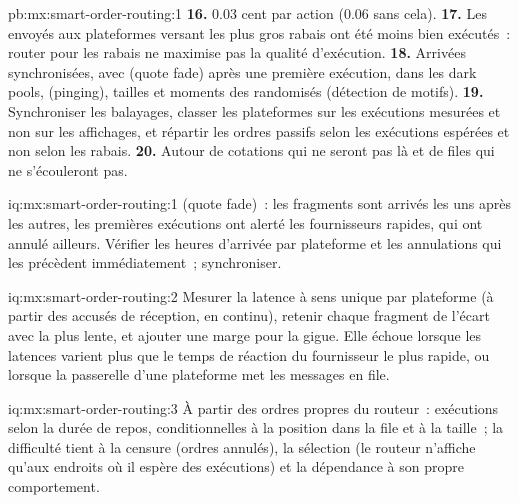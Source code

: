 \begin{solution}{pb:mx:smart-order-routing:1}
\textbf{16.} 0.03 cent par action (0.06 sans cela).
\textbf{17.} Les  envoyés aux plateformes versant les plus gros rabais ont été moins bien exécutés~: router pour les rabais ne maximise pas la qualité d'exécution.
\textbf{18.} Arrivées synchronisées, avec  (quote fade) après une première exécution,  dans les dark pools,  (pinging),
tailles et moments des  randomisés (détection de motifs).
\textbf{19.} Synchroniser les balayages, classer les plateformes sur les exécutions mesurées et non sur les affichages, et répartir les ordres passifs selon les exécutions espérées et non selon les rabais.
\textbf{20.} Autour de cotations qui ne seront pas là et de files qui ne s'écouleront pas.
\end{solution}

\begin{solution}{iq:mx:smart-order-routing:1}
 (quote fade)~: les fragments sont arrivés les uns après les autres, les premières exécutions ont alerté les fournisseurs rapides, qui ont annulé ailleurs. Vérifier les heures d'arrivée par plateforme et
les annulations qui les précèdent immédiatement~; synchroniser.
\end{solution}

\begin{solution}{iq:mx:smart-order-routing:2}
Mesurer la latence à sens unique par plateforme (à partir des accusés de réception, en continu), retenir chaque fragment de l'écart avec la plus lente, et ajouter une marge pour la gigue.
Elle échoue lorsque les latences varient plus que le temps de réaction du fournisseur le plus rapide, ou lorsque la passerelle d'une plateforme met les messages en file.
\end{solution}

\begin{solution}{iq:mx:smart-order-routing:3}
À partir des ordres propres du routeur~: exécutions selon la durée de repos, conditionnelles à la position dans la file et à la taille~; la difficulté tient à la censure (ordres annulés),
la sélection (le routeur n'affiche qu'aux endroits où il espère des exécutions) et la dépendance à son propre comportement.
\end{solution}

